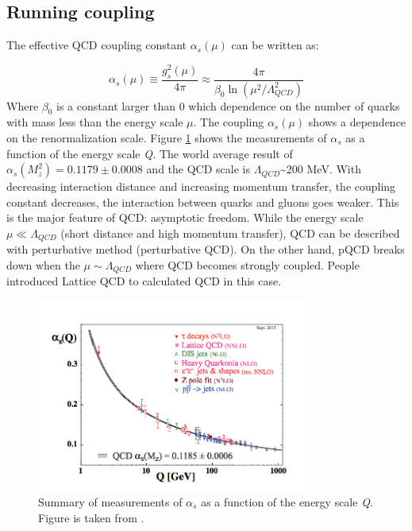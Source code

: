\subsection{Running coupling}

The effective QCD coupling constant $\alpha_{s}(\mu)$ can be written
as:

\begin{equation}
\alpha_{s}(\mu)\equiv\frac{g_{s}^{2}(\mu)}{4\pi}\approx\frac{4\pi}{\beta_{0}\ln(\mu^{2}/\Lambda_{QCD}^{2})}
\end{equation}
Where $\beta_{0}$ is a constant larger than 0 which dependence on
the number of quarks with mass less than the energy scale $\mu$.
The coupling $\alpha_{s}(\mu)$ shows a dependence on the renormalization
scale. Figure \ref{fig:QCD_as} shows the measurements of $\alpha_{s}$
as a function of the energy scale \emph{Q. }The world average result
of $\alpha_{s}(M_{z}^{2})=0.1179\pm0.0008$ \cite{PhysRevD.86.010001}
and the QCD scale is $\Lambda_{QCD}$\textasciitilde{}200 MeV. With
decreasing interaction distance and increasing momentum transfer,
the coupling constant decreases, the interaction between quarks and
gluons goes weaker. This is the major feature of QCD: asymptotic freedom.
While the energy scale $\mu\ll\Lambda_{QCD}$ (short distance and
high momentum transfer), QCD can be described with perturbative method
(perturbative QCD). On the other hand, pQCD breaks down when the $\mu\sim\Lambda_{QCD}$
where QCD becomes strongly coupled. People introduced Lattice QCD
to calculated QCD in this case. 

\begin{figure}
\begin{centering}
\includegraphics[width=0.8\textwidth]{fig/1.Introduction/QCD_as}
\par\end{centering}

\protect\caption{Summary of measurements of $\alpha_{s}$ as a function of the energy
scale\emph{ Q}. Figure is taken from \cite{PhysRevD.86.010001}.}


\label{fig:QCD_as}
\end{figure}



